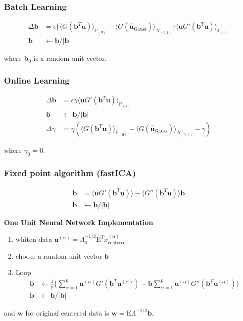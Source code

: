 \subsubsection{Batch Learning}
\begin{align*}
	\Delta\boldsymbol{b} &= \epsilon \Bigg \{ \langle G(\boldsymbol{b}^T\boldsymbol{u}) \rangle_{\mathbb{P}_(\boldsymbol{u})} - \langle G(\boldsymbol{\hat{u}}_{\text{Gauss}}) \rangle_{\mathcal{N}_{(0,1)}}  \Bigg \} \langle \boldsymbol{u} G'(\boldsymbol{b}^T\boldsymbol{u}) \rangle_{\mathbb{P}_{(u)}} \\
	\boldsymbol{b} &\leftarrow \boldsymbol{b}/|\boldsymbol{b}|
\end{align*}

where $\boldsymbol{b}_0$ is a random unit vector.

\subsubsection{Online Learning}
\begin{align*}
	\Delta\boldsymbol{b} &= \epsilon \gamma \langle \boldsymbol{u} G'(\boldsymbol{b}^T\boldsymbol{u}) \rangle_{\mathbb{P}_{(u)}} \\
	\boldsymbol{b} &\leftarrow \boldsymbol{b}/|\boldsymbol{b}| \\
	\Delta \gamma &= \eta ( \langle G(\boldsymbol{b}^T\boldsymbol{u}) \rangle_{\mathbb{P}_(\boldsymbol{u})} - \langle G(\boldsymbol{\hat{u}}_{\text{Gauss}}) \rangle_{\mathcal{N}_{(0,1)}}  - \gamma )
\end{align*}

where $\gamma_0 = 0$.

\subsubsection{Fixed point algorithm (fastICA)}
\begin{align*}
	\boldsymbol{b} &= \langle \boldsymbol{u} G'(\boldsymbol{b}^T\boldsymbol{u}) \rangle - \langle G''(\boldsymbol{b}^T\boldsymbol{u}) \rangle  \boldsymbol{b} \\
	\boldsymbol{b} &\leftarrow \boldsymbol{b}/|\boldsymbol{b}|
\end{align*}

\textbf{One Unit Neural Network Implementation}
\begin{enumerate}
	\item whiten data $\boldsymbol{u}^{(\alpha)} = \Lambda_0^{-1/2}\text{E}^Tx_{\text{centered}}^{(\alpha)} $ 
	\item choose a random unit vector $\boldsymbol{b}$
	\item Loop
\begin{align*}
	\boldsymbol{b} &\leftarrow \frac{1}{p} \Bigg \{ \sum_{\alpha=1}^{p} \boldsymbol{u}^{(\alpha)} G'(\boldsymbol{b}^T\boldsymbol{u}^{(\alpha)}) - \boldsymbol{b}\sum_{\alpha=1}^{p} \boldsymbol{u}^{(\alpha)} G''(\boldsymbol{b}^T\boldsymbol{u}^{(\alpha)})  \Bigg \} \\
		\boldsymbol{b} &\leftarrow \boldsymbol{b}/|\boldsymbol{b}|
\end{align*}
\end{enumerate}
and $\boldsymbol{w}$ for original centered data is $\boldsymbol{w} = \text{E} \Lambda^{-1/2} \boldsymbol{b}$.

